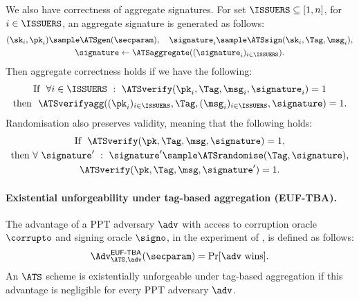 We also have correctness of aggregate signatures.  For set $\ISSUERS
\subseteq [1, n]$, for $i \in \ISSUERS$, an aggregate signature is generated as
follows:
%
\begin{gather*}
%
  (\sk_i, \pk_i) \sample \ATSgen(\secparam), \quad \signature_i \sample
\ATSsign(\sk_i, \Tag, \msg_i), \\ \signature \gets
\ATSaggregate((\signature_i)_{i \in \ISSUERS}).
\end{gather*}
%
Then aggregate correctness holds if we have the following:
\begin{gather*}
%
  \text{If } \ \forall i \in \ISSUERS \ : \ \ATSverify(\pk_i, \Tag, \msg_i,
\signature_i) = 1 \\ \text{then } \ \ATSverifyagg((\pk_i)_{i \in \ISSUERS},
\Tag, (\msg_i)_{i \in \ISSUERS}, \signature) = 1.
\end{gather*}
%
Randomisation also preserves validity, meaning that the following holds:
\begin{gather*}
%
  \text{If } \ \ATSverify(\pk, \Tag, \msg, \signature) = 1, \\ \text{then }
\forall \ \signature' \ : \  \signature' \sample \ATSrandomise(\Tag,
\signature), \\ \ATSverify(\pk, \Tag, \msg, \signature') = 1.
\end{gather*}
%

\paragraph{Existential unforgeability under tag-based aggregation (EUF-TBA).}
The advantage of a PPT
adversary $\adv$ with access to corruption oracle $\corrupto$ and signing
oracle $\signo$, in the experiment of , is defined as follows:
%
\begin{equation*}
%
  \Adv_{\ATS, \adv}^{\mathsf{EUF\text{-}TBA}}(\secparam) = \Pr[\adv \text{
wins}].
%
\end{equation*}
%
An $\ATS$
scheme is existentially unforgeable under tag-based aggregation if this
advantage is negligible for every PPT adversary $\adv$.

